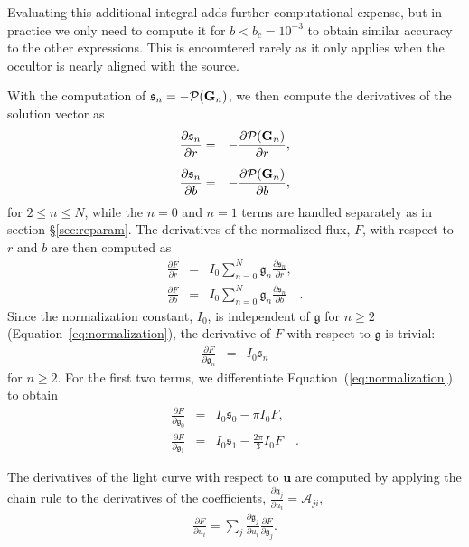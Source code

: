 \documentclass[modern,trackchanges]{aastex63}
\begin{document}
Evaluating this additional integral adds further computational expense, but in
practice we only need to compute it for $b < b_c = 10^{-3}$ to obtain similar accuracy
to the other expressions.  This is encountered rarely as it only applies when the
occultor is nearly aligned with the source.

With the computation of $\mathfrak{s}_n = -\mathcal{P}({\mathbf{G}}_n)$, we then
compute the derivatives of the solution vector as
\begin{eqnarray}
\frac{\partial \mathfrak{s}_n}{\partial r} &= & -\frac{\partial \mathcal{P}({\mathbf{G}}_n)}{\partial r},\\[0.5em]
\frac{\partial \mathfrak{s}_n}{\partial b} &= & -\frac{\partial \mathcal{P}({\mathbf{G}}_n)}{\partial b},
\end{eqnarray}
for $2 \le n \le N$, while the $n=0$ and $n=1$ terms are handled separately as in
section \S\ref{sec:reparam}.
%
The derivatives of the normalized flux, $F$, with respect to $r$ and $b$
are then computed as
%
\begin{eqnarray}\label{eq:derivatives}
\frac{\partial F}{\partial r} &=& I_0 \sum_{n=0}^N \mathfrak{g}_n \frac{\partial \mathfrak{s}_n}{\partial r},\\[0.5em]
\frac{\partial F}{\partial b} &=& I_0 \sum_{n=0}^N \mathfrak{g}_n \frac{\partial \mathfrak{s}_n}{\partial b} \quad.
\end{eqnarray}
%
Since the normalization constant, $I_0$,
is independent of $\mathfrak{g}$ for $n \ge 2$ (Equation~\ref{eq:normalization}), the derivative of $F$
with respect to $\mathfrak{g}$ is trivial:
%
\begin{eqnarray}
    \frac{\partial F}{\partial \mathfrak{g}_n} &=&  I_0 \mathfrak{s}_n
\end{eqnarray}
%
for $n \ge 2$. For the first two terms, we differentiate
Equation~(\ref{eq:normalization}) to obtain
%
\begin{eqnarray}
\frac{\partial F}{\partial \mathfrak{g}_0} &=&  I_0 \mathfrak{s}_0 - \pi I_0 F,\\[0.5em]
\frac{\partial F}{\partial \mathfrak{g}_1} &=&  I_0 \mathfrak{s}_1 - \frac{2\pi}{3} I_0 F\quad.
\end{eqnarray}

The derivatives of the light curve with respect to $\mathbf{u}$ are computed by applying
the chain rule to the derivatives of the coefficients, 
$\frac{\partial \mathfrak{g}_j}{\partial u_i} = \mathcal{A}_{ji}$,
\begin{eqnarray}\label{eq:dFdu}
\frac{\partial F}{\partial u_i} =  \sum_{j} \frac{\partial \mathfrak{g}_j}{\partial u_i}\frac{\partial F}{\partial \mathfrak{g}_j}.
\end{eqnarray}
\end{document}
